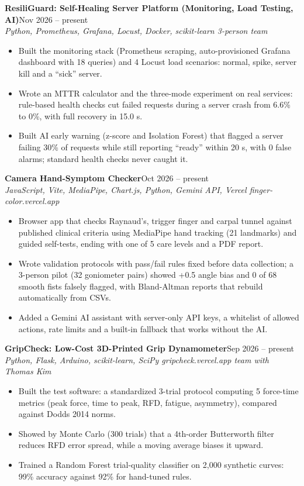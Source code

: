 \documentclass[10pt,letterpaper]{article}
\newcommand{\entry}[3]{\needspace{4\baselineskip}\textbf{#1}\hfill #2\\{\small\itshape #3}\par}
\begin{document}
\entry{ResiliGuard: Self-Healing Server Platform (Monitoring, Load Testing, AI)}{Nov 2026 -- present}{Python, Prometheus, Grafana, Locust, Docker, scikit-learn \textbar{} 3-person team}
\begin{itemize}
  \item Built the monitoring stack (Prometheus scraping, auto-provisioned Grafana dashboard with 18 queries) and 4 Locust load scenarios: normal, spike, server kill and a ``sick'' server.
  \item Wrote an MTTR calculator and the three-mode experiment on real services: rule-based health checks cut failed requests during a server crash from 6.6\% to 0\%, with full recovery in 15.0 s.
  \item Built AI early warning (z-score and Isolation Forest) that flagged a server failing 30\% of requests while still reporting ``ready'' within 20 s, with 0 false alarms; standard health checks never caught it.
\end{itemize}

\entry{Camera Hand-Symptom Checker}{Oct 2026 -- present}{JavaScript, Vite, MediaPipe, Chart.js, Python, Gemini API, Vercel \textbar{} finger-color.vercel.app}
\begin{itemize}
  \item Browser app that checks Raynaud's, trigger finger and carpal tunnel against published clinical criteria using MediaPipe hand tracking (21 landmarks) and guided self-tests, ending with one of 5 care levels and a PDF report.
  \item Wrote validation protocols with pass/fail rules fixed before data collection; a 3-person pilot (32 goniometer pairs) showed +0.5\textdegree{} angle bias and 0 of 68 smooth fists falsely flagged, with Bland-Altman reports that rebuild automatically from CSVs.
  \item Added a Gemini AI assistant with server-only API keys, a whitelist of allowed actions, rate limits and a built-in fallback that works without the AI.
\end{itemize}

\entry{GripCheck: Low-Cost 3D-Printed Grip Dynamometer}{Sep 2026 -- present}{Python, Flask, Arduino, scikit-learn, SciPy \textbar{} gripcheck.vercel.app \textbar{} team with Thomas Kim}
\begin{itemize}
  \item Built the test software: a standardized 3-trial protocol computing 5 force-time metrics (peak force, time to peak, RFD, fatigue, asymmetry), compared against Dodds 2014 norms.
  \item Showed by Monte Carlo (300 trials) that a 4th-order Butterworth filter reduces RFD error spread, while a moving average biases it upward.
  \item Trained a Random Forest trial-quality classifier on 2,000 synthetic curves: 99\% accuracy against 92\% for hand-tuned rules.
\end{itemize}
\end{document}
